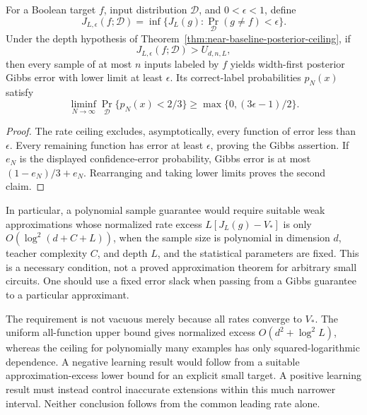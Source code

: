 \begin{corollary}
\label{cor:critical-excess-obstruction}
For a Boolean target $f$, input distribution $\mathcal D$, and
$0<\epsilon<1$, define
\[
 J_{L,\epsilon}(f;\mathcal D)=
 \inf\{J_L(g):\Pr_{\mathcal D}(g\ne f)<\epsilon\}.
\]
Under the depth hypothesis of
Theorem~\ref{thm:near-baseline-posterior-ceiling}, if
\[
 J_{L,\epsilon}(f;\mathcal D)>U_{d,n,L},
\]
then every sample of at most $n$ inputs labeled by $f$ yields
width-first posterior Gibbs error with lower limit at least $\epsilon$.
Its correct-label probabilities $p_N(x)$ satisfy
\[
 \liminf_{N\to\infty}\Pr_{\mathcal D}\{p_N(x)<2/3\}
 \ge\max\{0,(3\epsilon-1)/2\}.
\]
\end{corollary}

\begin{proof}
The rate ceiling excludes, asymptotically, every function of error
less than $\epsilon$. Every remaining function has error at least
$\epsilon$, proving the Gibbs assertion. If $e_N$ is the displayed
confidence-error probability, Gibbs error is at most
$(1-e_N)/3+e_N$. Rearranging and taking lower limits proves the second
claim.
\end{proof}

In particular, a polynomial sample guarantee would require suitable
weak approximations whose normalized rate excess
$L[J_L(g)-V_*]$ is only $O(\log^2(d+C+L))$, when the sample size is
polynomial in dimension $d$, teacher complexity $C$, and depth $L$,
and the statistical parameters are fixed. This is a necessary
condition, not a proved approximation theorem for arbitrary small
circuits. One should use a fixed error slack when passing from a
Gibbs guarantee to a particular approximant.

The requirement is not vacuous merely because all rates converge to
$V_*$. The uniform all-function upper bound gives normalized excess
$O(d^2+\log^2 L)$, whereas the ceiling for polynomially many examples
has only squared-logarithmic dependence. A negative learning result
would follow from a suitable approximation-excess lower bound for an
explicit small target. A positive learning result must instead control
inaccurate extensions within this much narrower interval. Neither
conclusion follows from the common leading rate alone.
